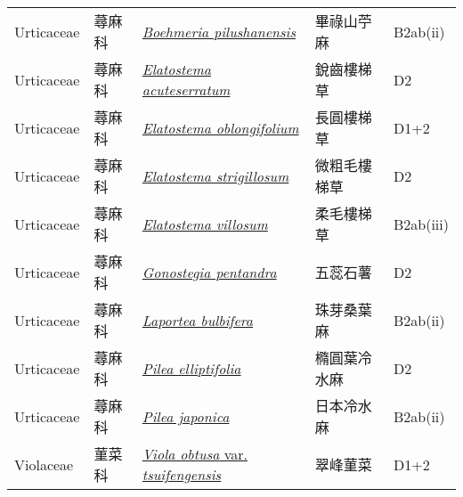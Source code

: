 {\begin{longtable}{p{2.5cm}p{2.5cm}p{4.5cm}p{2.5cm}p{3cm}}
    Urticaceae & 蕁麻科 & \href{http://www.theplantlist.org/tpl1.1/search?q=Boehmeria+pilushanensis}{\textit{Boehmeria pilushanensis} } & 畢祿山苧麻 & B2ab(ii) \index{Boehmeria@\textit{Boehmeria}!pilushanensis@\textit{pilushanensis}}  \index{畢祿山苧麻} \\
    Urticaceae & 蕁麻科 & \href{http://www.theplantlist.org/tpl1.1/search?q=Elatostema+acuteserratum}{\textit{Elatostema acuteserratum} } & 銳齒樓梯草 & D2 \index{Elatostema@\textit{Elatostema}!acuteserratum@\textit{acuteserratum}}  \index{銳齒樓梯草} \\
    Urticaceae & 蕁麻科 & \href{http://www.theplantlist.org/tpl1.1/search?q=Elatostema+oblongifolium}{\textit{Elatostema oblongifolium} } & 長圓樓梯草 & D1+2 \index{Elatostema@\textit{Elatostema}!oblongifolium@\textit{oblongifolium}}  \index{長圓樓梯草} \\
    Urticaceae & 蕁麻科 & \href{http://www.theplantlist.org/tpl1.1/search?q=Elatostema+strigillosum}{\textit{Elatostema strigillosum} } & 微粗毛樓梯草 & D2 \index{Elatostema@\textit{Elatostema}!strigillosum@\textit{strigillosum}}  \index{微粗毛樓梯草} \\
    Urticaceae & 蕁麻科 & \href{http://www.theplantlist.org/tpl1.1/search?q=Elatostema+villosum}{\textit{Elatostema villosum} } & 柔毛樓梯草 & B2ab(iii) \index{Elatostema@\textit{Elatostema}!villosum@\textit{villosum}}  \index{柔毛樓梯草} \\
    Urticaceae & 蕁麻科 & \href{http://www.theplantlist.org/tpl1.1/search?q=Gonostegia+pentandra}{\textit{Gonostegia pentandra} } & 五蕊石薯 & D2 \index{Gonostegia@\textit{Gonostegia}!pentandra@\textit{pentandra}}  \index{五蕊石薯} \\
    Urticaceae & 蕁麻科 & \href{http://www.theplantlist.org/tpl1.1/search?q=Laportea+bulbifera}{\textit{Laportea bulbifera} } & 珠芽桑葉麻 & B2ab(ii) \index{Laportea@\textit{Laportea}!bulbifera@\textit{bulbifera}}  \index{珠芽桑葉麻} \\
    Urticaceae & 蕁麻科 & \href{http://www.theplantlist.org/tpl1.1/search?q=Pilea+elliptifolia}{\textit{Pilea elliptifolia} } & 橢圓葉冷水麻 & D2 \index{Pilea@\textit{Pilea}!elliptifolia@\textit{elliptifolia}}  \index{橢圓葉冷水麻} \\
    Urticaceae & 蕁麻科 & \href{http://www.theplantlist.org/tpl1.1/search?q=Pilea+japonica}{\textit{Pilea japonica} } & 日本冷水麻 & B2ab(ii) \index{Pilea@\textit{Pilea}!japonica@\textit{japonica}}  \index{日本冷水麻} \\
    Violaceae & 菫菜科 & \href{http://www.theplantlist.org/tpl1.1/search?q=Viola+obtusa+var.+tsuifengensis}{\textit{Viola obtusa} var. \textit{tsuifengensis} } & 翠峰菫菜 & D1+2 \index{Viola@\textit{Viola}!obtusa@\textit{obtusa}!var. tsuifengensis@var. \textit{tsuifengensis}}  \index{翠峰菫菜} \\

\end{longtable}}
